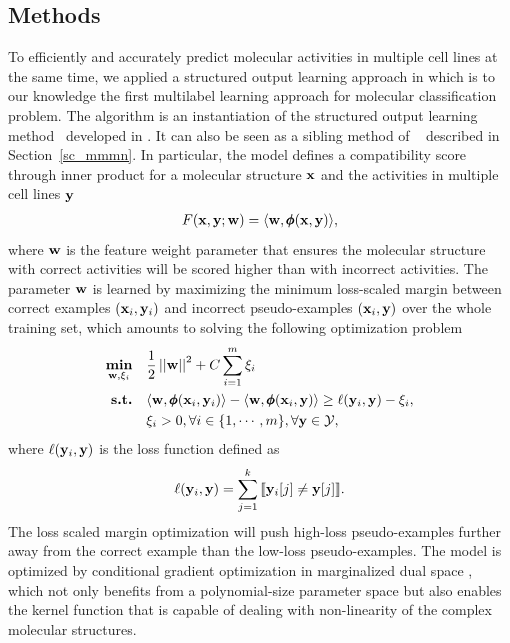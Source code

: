{%
%
\subsection{Methods}

To efficiently and accurately predict molecular activities in multiple cell lines at the same time, we applied a structured output learning approach in  which is to our knowledge the first multilabel learning approach for molecular classification problem.
The algorithm is an instantiation of the structured output learning method \mmcrf\ developed in \citep{Rousu07}.
It can also be seen as a sibling method of \mmmn\ \citep{Taskar04max} described in Section~\ref{sc_mmmn}.
In particular, the model defines a compatibility score through inner product for a molecular structure $\mathbf {x}$ and the activities in multiple cell lines $\mathbf {y}$
\begin{align*}
	F(\mathbf {x},\mathbf {y};\mathbf {w}) = \langle \mathbf {w}, \pmb \phi(\mathbf {x},\mathbf {y}) \rangle,
\end{align*}
where $\mathbf {w}$ is the feature weight parameter that ensures the molecular structure with correct activities will be scored higher than with incorrect activities.
The parameter $\mathbf {w}$ is learned by maximizing the minimum loss-scaled margin between correct examples $(\mathbf {x}_i,\mathbf {y}_i)$ and incorrect pseudo-examples $(\mathbf {x}_i,\mathbf {y})$ over the whole training set, which amounts to solving the following optimization problem
\begin{align*}
	\underset{\mathbf {w},\mathbf{\xi}_i}{\textbf{min}} & \quad \frac{1}{2}\left|\left| \mathbf {w} \right|\right|^2 + C\sum_{i=1}^{m}\xi_i\\
	\textbf{s.t.} &\quad \langle \mathbf {w}, \pmb \phi(\mathbf {x}_i,\mathbf {y}_i) \rangle - \langle \mathbf {w}, \pmb \phi(\mathbf {x}_i,\mathbf {y}) \rangle \ge \ell(\mathbf {y}_i,\mathbf {y})-\xi_i,\\
	&\quad \xi_i>0, \forall i\in\{1,\cdots,m\}, \forall \mathbf {y}\in\mathcal{Y},
\end{align*}
where $\ell(\mathbf {y}_i,\mathbf {y})$ is the loss function defined as
\begin{align*}
	\ell(\mathbf {y}_i,\mathbf {y}) = \sum_{j=1}^{k}{\llbracket \mathbf {y}_i[j]\neq \mathbf {y}[j] \rrbracket}.
\end{align*}
The loss scaled margin optimization will push high-loss pseudo-examples further away from the correct example than the low-loss pseudo-examples.
The model is optimized by conditional gradient optimization \citep{Bertsekas95nonlinear} in marginalized dual space \citep{Taskar04max}, which not only benefits from a polynomial-size parameter space but also enables the kernel function that is capable of dealing with non-linearity of the complex molecular structures.

}
